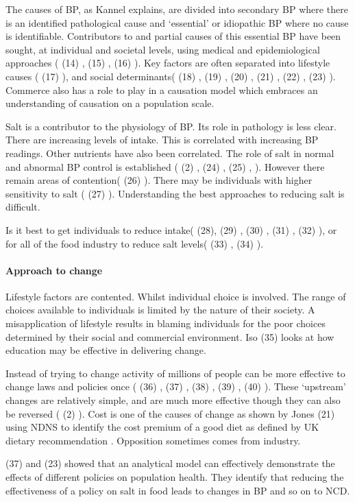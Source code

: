 \documentclass[
]{article}
\begin{document}
The causes of BP, as Kannel explains, are divided into secondary BP
where there is an identified pathological cause and `essential' or
idiopathic BP where no cause is identifiable. Contributors to and
partial causes of this essential BP have been sought, at individual and
societal levels, using medical and epidemiological approaches ( (14) ,
(15) , (16) ). Key factors are often separated into lifestyle causes (
(17) ), and social determinants( (18) , (19) , (20) , (21) , (22) , (23)
). Commerce also has a role to play in a causation model which embraces
an understanding of causation on a population scale.

Salt is a contributor to the physiology of BP. Its role in pathology is
less clear. There are increasing levels of intake. This is correlated
with increasing BP readings. Other nutrients have also been correlated.
The role of salt in normal and abnormal BP control is established ( (2)
, (24) , (25) , ). However there remain areas of contention( (26) ).
There may be individuals with higher sensitivity to salt ( (27) ).
Understanding the best approaches to reducing salt is difficult.

Is it best to get individuals to reduce intake( (28), (29) , (30) , (31)
, (32) ), or for all of the food industry to reduce salt levels( (33) ,
(34) ).

\hypertarget{approach-to-change}{%
\paragraph{Approach to change}\label{approach-to-change}}

Lifestyle factors are contented. Whilst individual choice is involved.
The range of choices available to individuals is limited by the nature
of their society. A misapplication of lifestyle results in blaming
individuals for the poor choices determined by their social and
commercial environment. Iso (35) looks at how education may be effective
in delivering change.

Instead of trying to change activity of millions of people can be more
effective to change laws and policies once ( (36) , (37) , (38) , (39) ,
(40) ). These `upstream' changes are relatively simple, and are much
more effective though they can also be reversed ( (2) ). Cost is one of
the causes of change as shown by Jones (21) using NDNS to identify the
cost premium of a good diet as defined by UK dietary recommendation .
Opposition sometimes comes from industry.

(37) and (23) showed that an analytical model can effectively
demonstrate the effects of different policies on population health. They
identify that reducing the effectiveness of a policy on salt in food
leads to changes in BP and so on to NCD.
\end{document}
